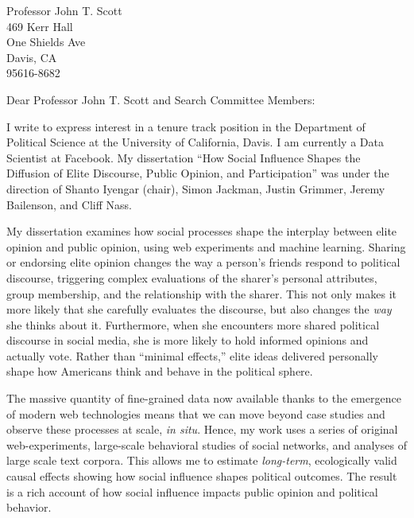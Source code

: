 \documentclass[fontsize=12pt, paper=a4]{scrlttr2}
\date{September 15, 2014}
\begin{document}
\enlargethispage{6\baselineskip}

\begin{letter}{Professor John T. Scott\\
469 Kerr Hall\\
One Shields Ave\\
Davis, CA\\
95616-8682}

\opening{Dear Professor John T. Scott and Search Committee Members:}  %

I write to express interest in a tenure track position in the Department of Political Science at the University of California, Davis.  I am currently a Data Scientist at Facebook.  %
My dissertation ``How Social Influence Shapes the Diffusion of Elite Discourse, Public Opinion, and Participation'' was under the direction of Shanto Iyengar (chair), Simon Jackman, Justin Grimmer, Jeremy Bailenson, and Cliff Nass.

My dissertation examines how social processes shape the interplay between elite opinion and public opinion, using web experiments and machine learning.  Sharing or endorsing elite opinion changes the way a person's friends respond to political discourse, triggering complex evaluations of the sharer's personal attributes, group membership, and the relationship with the sharer.  This not only makes it more likely that she carefully evaluates the discourse, but also changes the \emph{way} she thinks about it.  Furthermore, when she encounters more shared political discourse in social media, she is more likely to hold informed opinions and actually vote.  Rather than ``minimal effects,'' elite ideas delivered personally shape how Americans think and behave in the political sphere.

The massive quantity of fine-grained data now available thanks to the emergence of modern web technologies means that we can move beyond case studies and observe these processes at scale, \emph{in situ}.  Hence, my work uses a series of original web-experiments, large-scale behavioral studies of social networks, and analyses of large scale text corpora.  This allows me to estimate \emph{long-term}, ecologically valid causal effects showing how social influence shapes political outcomes.  The result is a rich account of how social influence impacts public opinion and political behavior.  


\end{letter}
\end{document}

